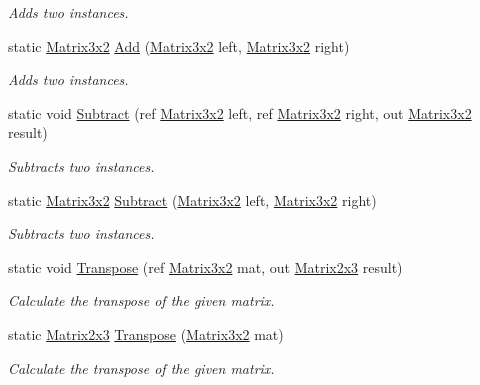 \begin{DoxyCompactItemize}
\begin{DoxyCompactList}\small\item\em Adds two instances. \end{DoxyCompactList}\item 
static \hyperlink{struct_open_t_k_1_1_matrix3x2}{Matrix3x2} \hyperlink{struct_open_t_k_1_1_matrix3x2_adfa63ddd09ea30cbeaf8ed4b54baf200}{Add} (\hyperlink{struct_open_t_k_1_1_matrix3x2}{Matrix3x2} left, \hyperlink{struct_open_t_k_1_1_matrix3x2}{Matrix3x2} right)
\begin{DoxyCompactList}\small\item\em Adds two instances. \end{DoxyCompactList}\item 
static void \hyperlink{struct_open_t_k_1_1_matrix3x2_a0c89b90f210c614d5d0dadefecd5fb97}{Subtract} (ref \hyperlink{struct_open_t_k_1_1_matrix3x2}{Matrix3x2} left, ref \hyperlink{struct_open_t_k_1_1_matrix3x2}{Matrix3x2} right, out \hyperlink{struct_open_t_k_1_1_matrix3x2}{Matrix3x2} result)
\begin{DoxyCompactList}\small\item\em Subtracts two instances. \end{DoxyCompactList}\item 
static \hyperlink{struct_open_t_k_1_1_matrix3x2}{Matrix3x2} \hyperlink{struct_open_t_k_1_1_matrix3x2_a0fc16faa2fc4d53af258a140befa44fb}{Subtract} (\hyperlink{struct_open_t_k_1_1_matrix3x2}{Matrix3x2} left, \hyperlink{struct_open_t_k_1_1_matrix3x2}{Matrix3x2} right)
\begin{DoxyCompactList}\small\item\em Subtracts two instances. \end{DoxyCompactList}\item 
static void \hyperlink{struct_open_t_k_1_1_matrix3x2_a70b33a595adc0035d664243638eca131}{Transpose} (ref \hyperlink{struct_open_t_k_1_1_matrix3x2}{Matrix3x2} mat, out \hyperlink{struct_open_t_k_1_1_matrix2x3}{Matrix2x3} result)
\begin{DoxyCompactList}\small\item\em Calculate the transpose of the given matrix. \end{DoxyCompactList}\item 
static \hyperlink{struct_open_t_k_1_1_matrix2x3}{Matrix2x3} \hyperlink{struct_open_t_k_1_1_matrix3x2_a74f2536de5b664853d2d05546cee768d}{Transpose} (\hyperlink{struct_open_t_k_1_1_matrix3x2}{Matrix3x2} mat)
\begin{DoxyCompactList}\small\item\em Calculate the transpose of the given matrix. \end{DoxyCompactList}\item 

\end{DoxyCompactItemize}
